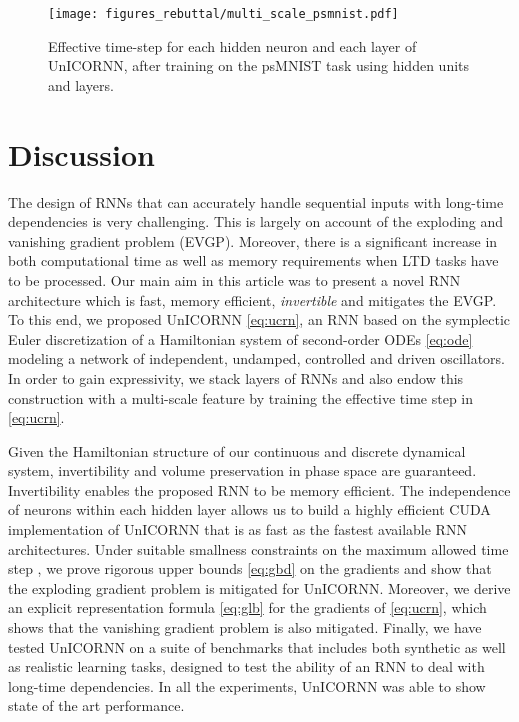 \documentclass{article}
\begin{document}
\begin{figure}[ht]
\vskip 0.2in
\begin{center}
\centerline{\texttt{[image: figures\_rebuttal/multi\_scale\_psmnist.pdf]}}
\caption{Effective time-step  for each hidden neuron  and each layer  of UnICORNN, after training on the psMNIST task using  hidden units and  layers.}
\label{fig:multi_scale_psmnist}
\end{center}
\vskip -0.2in
\end{figure}

\section{Discussion}
The design of RNNs that can accurately handle sequential inputs with long-time dependencies is very challenging. This is largely on account of the exploding and vanishing gradient problem (EVGP). Moreover, there is a significant increase in both computational time as well as memory requirements when LTD tasks have to be processed. Our main aim in this article was to present a novel RNN architecture which is fast, memory efficient, \emph{invertible} and mitigates the EVGP. To this end, we proposed UnICORNN \eqref{eq:ucrn}, an RNN based on the symplectic Euler discretization of a Hamiltonian system of second-order ODEs \eqref{eq:ode} modeling a network of independent, undamped, controlled and driven oscillators. In order to gain expressivity, we stack layers of RNNs and also endow this construction with a multi-scale feature by training the effective time step in \eqref{eq:ucrn}. 

Given the Hamiltonian structure of our continuous and discrete dynamical system, invertibility and volume preservation in phase space are guaranteed. Invertibility enables the proposed RNN to be memory efficient. The independence of neurons within each hidden layer allows us to build a highly efficient CUDA implementation of UnICORNN that is as fast as the fastest available RNN architectures. Under suitable smallness constraints on the maximum allowed time step , we prove rigorous upper bounds \eqref{eq:gbd} on the gradients and show that the exploding gradient problem is mitigated for UnICORNN. Moreover, we derive an explicit representation formula \eqref{eq:glb} for the gradients of \eqref{eq:ucrn}, which shows that the vanishing gradient problem is also mitigated. Finally, we have tested UnICORNN on a suite of benchmarks that includes both synthetic as well as realistic learning tasks, designed to test the ability of an RNN to deal with long-time dependencies. In all the experiments, UnICORNN was able to show state of the art performance. 
\end{document}
